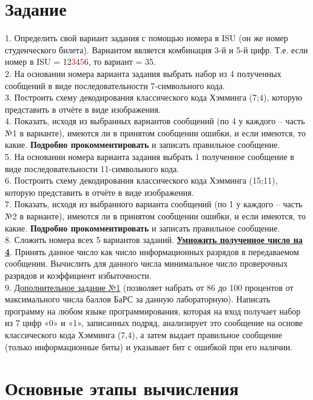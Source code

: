 \section{Задание}
\large
1. Определить свой вариант задания с помощью номера в ISU (он же номер студенческого билета). Вариантом является комбинация 3-й и 5-й цифр. Т.е. если номер в ISU = 12\textcolor{red}{3}4\textcolor{red}{5}6, то вариант = 35. \\
2. На основании номера варианта задания выбрать набор из 4 полученных сообщений в виде последовательности 7-символьного кода. \\
3. Построить схему декодирования классического кода Хэмминга (7;4), которую представить в отчёте в виде изображения. \\
4. Показать, исходя из выбранных вариантов сообщений (по 4 у каждого – часть №1 в варианте), имеются ли в принятом сообщении ошибки, и если имеются, то какие. \textbf{Подробно прокомментировать} и записать правильное сообщение. \\
5. На основании номера варианта задания выбрать 1 полученное сообщение в виде последовательности 11-символьного кода. \\
6. Построить схему декодирования классического кода Хэмминга (15;11), которую представить в отчёте в виде изображения. \\
7. Показать, исходя из выбранного варианта сообщений (по 1 у каждого – часть №2 в варианте), имеются ли в принятом сообщении ошибки, и если имеются, то какие. \textbf{Подробно прокомментировать} и записать правильное сообщение. \\
8. Сложить номера всех 5 вариантов заданий. \uline{\textbf{Умножить полученное число на 4}}. Принять данное число как число информационных разрядов в передаваемом сообщении. Вычислить для данного числа минимальное число проверочных разрядов и коэффициент избыточности. \\
9. \uline{Дополнительное задание №1} (позволяет набрать от 86 до 100 процентов от максимального числа баллов БаРС за данную лабораторную). Написать программу на любом языке программирования, которая на вход получает набор из 7 цифр «0» и «1», записанных подряд, анализирует это сообщение
на основе классического кода Хэмминга (7,4), а затем выдает правильное сообщение (только информационные биты) и 
указывает бит с ошибкой при его наличии.

\section{Основные этапы вычисления}
